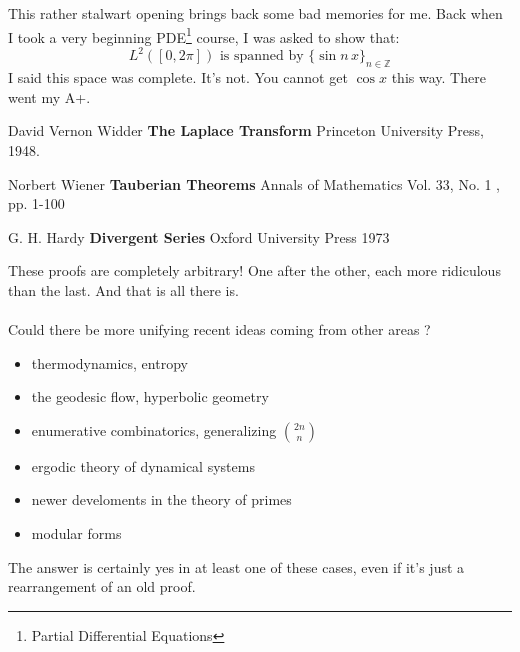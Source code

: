 \documentclass[12pt]{article}
\begin{document}
\noindent This rather stalwart opening brings back some bad memories for me.  Back when I took a very beginning PDE\footnote{Partial Differential Equations} course, I was asked to show that:
$$ L^2([0,2\pi]) \text{ is spanned by } \{\sin n \, x\}_{n \in \mathbb{Z}}$$
I said this space was complete.  It's not.  You cannot get $\cos x$ this way.  There went my A+.


\selectfont \fontsize{12}{10}\selectfont


\begin{thebibliography}{}

\item David Vernon Widder \textbf{The Laplace Transform} Princeton University Press, 1948.

\item Norbert Wiener \textbf{Tauberian Theorems} Annals of Mathematics Vol. 33, No. 1 , pp. 1-100

\item G. H. Hardy \textbf{Divergent Series} Oxford University Press 1973

\end{thebibliography}

\newpage


\noindent These proofs are completely arbitrary!  One after the other, each more ridiculous than the last.  And that is all there is. \\ \\
Could there be more unifying recent ideas coming from other areas ?
\begin{itemize}
\item thermodynamics, entropy
\item the geodesic flow, hyperbolic geometry
\item enumerative combinatorics, generalizing $\binom{2n}{n}$
\item ergodic theory of dynamical systems
\item newer develoments in the theory of primes
\item modular forms \\
\end{itemize}
The answer is certainly yes in at least one of these cases, even if it's just a rearrangement of an old proof. \\

\selectfont \fontsize{25}{30}\selectfont
\end{document}
